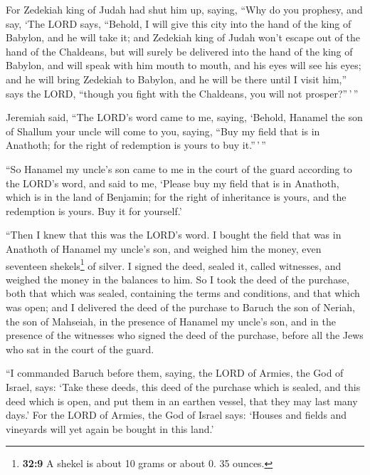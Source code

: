  For Zedekiah king of Judah had shut him up, saying, ``Why
do you prophesy, and say, `The LORD says, ``Behold, I will give this
city into the hand of the king of Babylon, and he will take it;
 and Zedekiah king of Judah won't escape out of the hand
of the Chaldeans, but will surely be delivered into the hand of the king
of Babylon, and will speak with him mouth to mouth, and his eyes will
see his eyes;  and he will bring Zedekiah to Babylon, and
he will be there until I visit him,'' says the LORD, ``though you fight
with the Chaldeans, you will not prosper?''\,'\,''

 Jeremiah said, ``The LORD's word came to me, saying,
 `Behold, Hanamel the son of Shallum your uncle will come
to you, saying, ``Buy my field that is in Anathoth; for the right of
redemption is yours to buy it.''\,'\,''

 ``So Hanamel my uncle's son came to me in the court of
the guard according to the LORD's word, and said to me, `Please buy my
field that is in Anathoth, which is in the land of Benjamin; for the
right of inheritance is yours, and the redemption is yours. Buy it for
yourself.'

``Then I knew that this was the LORD's word.  I bought the
field that was in Anathoth of Hanamel my uncle's son, and weighed him
the money, even seventeen shekels\footnote{\textbf{32:9} A shekel is
  about 10 grams or about 0. 35 ounces.} of silver.  I
signed the deed, sealed it, called witnesses, and weighed the money in
the balances to him.  So I took the deed of the purchase,
both that which was sealed, containing the terms and conditions, and
that which was open;  and I delivered the deed of the
purchase to Baruch the son of Neriah, the son of Mahseiah, in the
presence of Hanamel my uncle's son, and in the presence of the witnesses
who signed the deed of the purchase, before all the Jews who sat in the
court of the guard.

 ``I commanded Baruch before them, saying,
 the LORD of Armies, the God of Israel, says: `Take these
deeds, this deed of the purchase which is sealed, and this deed which is
open, and put them in an earthen vessel, that they may last many days.'
 For the LORD of Armies, the God of Israel says: `Houses
and fields and vineyards will yet again be bought in this land.'

